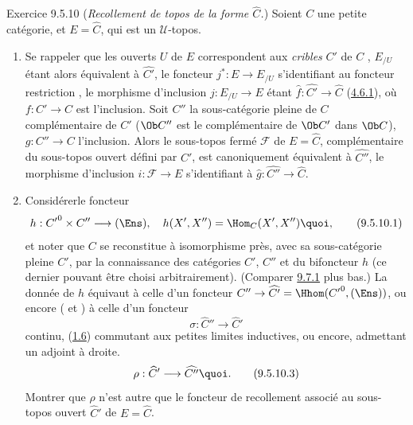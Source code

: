 \documentclass[10pt]{../fichiers-configuration-latex/smfart}
\begin{document}
\begin{enonce*}[remark]{Exercice 9.5.10}
(\emph{Recollement de topos de la forme $\widehat{C}$.}) Soient $C$
une petite catégorie, et $E=\widehat{C}$, qui est un
$𝒰$-topos.
\begin{enumerate}
\renewcommand{\theenumi}{\alph{enumi}}
\renewcommand{\labelenumi}{\theenumi)}
\item Se rappeler que les ouverts $U$ de $E$ correspondent aux
\emph{cribles} $C'$ de $C$ , $E_{/U}$
étant alors équivalent à $\widehat{C'}$, le foncteur
$j^{\ast}:E\rightarrow E_{/U}$ s'identifiant au foncteur restriction
, \ie le morphisme d'inclusion $j:E_{/U}\rightarrow E$ étant
$\widehat{f}:\widehat{C'}\rightarrow \widehat{C}$
(\hyperref[IV.subsubsec4.6.1]{4.6.1}), où $f:C'\rightarrow C$ est l'inclusion.
Soit $C''$ la sous-catégorie pleine de $C$ complémentaire de $C'$
(\ie $\Ob C''$ est le complémentaire de $\Ob C'$ dans $\Ob C$),
$g:C''\rightarrow C$ l'inclusion. Alors le sous-topos fermé
$\mathcal{F}$ de $E=\widehat{C}$, complémentaire du sous-topos
ouvert défini par $C'$, est canoniquement équivalent à
$\widehat{C''}$, le morphisme d'inclusion $i:\mathcal{F}\rightarrow
E$ s'identifiant à $\widehat{g}:\widehat{C''}\rightarrow
\widehat{C}$.

\item Considérer\pageoriginale le foncteur
\begin{equation*}
h:{C'}^0\times C''\longrightarrow (\Ens),\quad
h(X',X'')=\Hom_C(X',X''){\quoi},\tag{9.5.10.1}
\end{equation*}
et noter que $C$ se reconstitue à isomorphisme près, avec sa
sous-catégorie pleine $C'$, par la connaissance des catégories $C'$,
$C''$ et du bifoncteur $h$ (ce dernier pouvant être choisi
arbitrairement). (Comparer \hyperref[IV.subsec9.7.1]{9.7.1} plus bas.) La donnée
de $h$ équivaut à celle d'un foncteur $C''\rightarrow
\widehat{C'}=\Hhom({C'}^0,(\Ens))$, ou encore ( et
) à celle d'un foncteur
\begin{equation*}
\sigma:\widehat{C}''\longrightarrow \widehat{C}'\tag{9.5.10.2}
\end{equation*}
continu, \ie (\hyperref[IV.cor1.6]{1.6}) commutant aux petites limites
inductives, ou encore, admettant un adjoint à droite.
\begin{equation*}
\rho:\widehat{C}'\longrightarrow \widehat{C''}{\quoi}.\tag{9.5.10.3}
\end{equation*}
Montrer que $\rho$ n'est autre que le foncteur de recollement
associé au sous-topos ouvert $\widehat{C}'$ de $E=\widehat{C}$.


\end{enumerate}
\end{enonce*}
\end{document}
